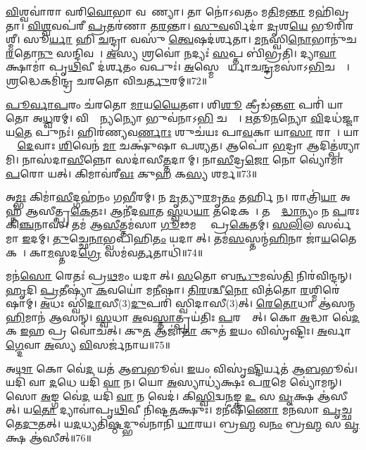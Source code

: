 \ul{𑌵𑌿}𑌶𑍍𑌵𑌵𑌾॑𑌰𑌾 𑌵𑌰𑌿\ul{𑌵𑍋}𑌭𑌾 𑌵𑌰𑍇᳚𑌣𑍍𑌯𑌾।
𑌤𑌾 𑌨𑍋॑𑌽𑌵𑌤𑌂 𑌮\ul{𑌤𑌿}𑌮\ul{𑌨𑍍𑌤𑌾} 𑌮𑌹𑌿॑𑌵𑍍𑌰𑌤𑌾।
\ul{𑌵𑌿}\ul{𑌶𑍍𑌵}𑌵𑌪॑𑌰𑍀 \ul{𑌪𑍍𑌰}𑌤𑌰॑𑌣𑌾 𑌤\ul{𑌰}𑌨𑍍𑌤𑌾।
\ul{𑌸𑍁}\ul{𑌵}𑌰𑍍𑌵𑌿𑌦𑌾॑ \ul{𑌦𑍃}𑌶\ul{𑌯𑍇} 𑌭𑍂𑌰𑌿॑𑌰𑌶𑍍𑌮𑍀।
𑌸𑍂\ul{𑌰𑍍𑌯𑌾} 𑌹𑌿 \ul{𑌚}𑌨𑍍𑌦𑍍𑌰𑌾 𑌵𑌸𑍁॑ \ul{𑌤𑍍𑌵𑍇}𑌷𑌦॑𑌰𑍍\mbox{}𑌶𑌤𑌾।
\ul{𑌮}\ul{𑌨}𑌸𑍍𑌵𑌿\ul{𑌨𑍋}𑌭𑌾𑌨𑍁॑𑌚\ul{𑌰}𑌤𑍋\ul{𑌨𑍁} 𑌸𑌨𑍍𑌦𑌿𑌵𑌮𑍍᳚।
\ul{𑌅}𑌸𑍍𑌯 𑌶𑍍𑌰𑌵𑍋॑ \ul{𑌨}𑌦𑍍𑌯𑌃॑ \ul{𑌸}𑌪𑍍𑌤 𑌬𑌿॑𑌭𑍍𑌰𑌤𑌿।
𑌦𑍍𑌯𑌾\ul{𑌵𑌾} 𑌕𑍍𑌷𑌾𑌮𑌾॑ 𑌪𑍃\ul{𑌥𑌿}𑌵𑍀 𑌦॑𑌰𑍍\mbox{}\ul{𑌶}𑌤𑌂 𑌵𑌪𑍁𑌃॑।
\ul{𑌅}𑌸𑍍𑌮𑍇 𑌸𑍂᳚𑌰𑍍𑌯𑌾𑌚\ul{𑌨𑍍𑌦𑍍𑌰}𑌮𑌸𑌾॑\-𑌽\ul{𑌭𑌿}𑌚𑌕𑍍𑌷𑍇᳚।
\ul{𑌶𑍍𑌰}𑌦𑍍𑌧𑍇𑌕𑌮𑌿॑𑌨𑍍𑌦𑍍𑌰 𑌚𑌰𑌤𑍋 𑌵𑌿𑌚\ul{𑌰𑍍𑌤𑍁}𑌰𑌮𑍍॥72॥

\ul{𑌪𑍂}\ul{𑌰𑍍𑌵𑌾}\ul{𑌪}𑌰𑌂 𑌚॑𑌰𑌤𑍋 \ul{𑌮𑌾}𑌯\ul{𑌯𑍈}𑌤𑍗।
𑌶𑌿\ul{𑌶𑍂} 𑌕𑍍𑌰𑍀𑌡॑\ul{𑌨𑍍𑌤𑍗} 𑌪𑌰𑌿॑ 𑌯𑌾𑌤𑍋 𑌅\ul{𑌧𑍍𑌵}𑌰𑌮𑍍।
𑌵𑌿𑌶𑍍𑌵𑌾᳚\ul{𑌨𑍍𑌯}𑌨𑍍𑌯𑍋 𑌭𑍁𑌵॑𑌨𑌾𑌽\ul{𑌭𑌿} 𑌚𑌷𑍍𑌟𑍇᳚।
\ul{𑌋}𑌤𑍂\ul{𑌨}𑌨𑍍𑌯𑍋 \ul{𑌵𑌿}𑌦𑌧॑𑌜𑍍𑌜𑌾𑌯\ul{𑌤𑍇} 𑌪𑍁𑌨𑌃॑।
𑌹𑌿𑌰॑𑌣𑍍𑌯𑌵\ul{𑌰𑍍𑌣𑌾𑌃} 𑌶𑍁𑌚॑𑌯𑌃 𑌪𑌾\ul{𑌵}𑌕𑌾 𑌯𑌾\ul{𑌸𑌾}\ul{} 𑌰𑌾𑌜𑌾᳚।
𑌯𑌾𑌸𑌾𑌂᳚ \ul{𑌦𑍇}𑌵𑌾𑌃 \ul{𑌶𑌿}𑌵𑍇𑌨॑ \ul{𑌮𑌾} 𑌚𑌕𑍍𑌷𑍁॑𑌷𑌾 𑌪𑌶𑍍𑌯𑌤।
𑌆𑌪𑍋॑ \ul{𑌭}𑌦𑍍𑌰𑌾 𑌆𑌦𑌿𑌤𑍍𑌪॑𑌶𑍍𑌯𑌾𑌮𑌿।
𑌨𑌾𑌸॑𑌦𑌾\ul{𑌸𑍀}𑌨𑍍𑌨𑍋 𑌸𑌦𑌾॑𑌸𑍀\ul{𑌤𑍍𑌤}𑌦𑌾𑌨𑍀᳚𑌮𑍍।
𑌨𑌾\ul{𑌸𑍀}𑌦𑍍𑌰\ul{𑌜𑍋} 𑌨𑍋 𑌵𑍍𑌯𑍋॑𑌮𑌾 \ul{𑌪}𑌰𑍋 𑌯𑌤𑍍।
𑌕𑌿𑌮𑌾𑌵॑𑌰𑍀\ul{𑌵𑌃} 𑌕𑍁\ul{𑌹} 𑌕\ul{𑌸𑍍𑌯} 𑌶𑌰𑍍𑌮\sn{}॥73॥

𑌅\ul{𑌮𑍍𑌭𑌃} 𑌕𑌿𑌮𑌾॑\ul{𑌸𑍀}𑌦𑍍𑌗𑌹॑𑌨𑌂 𑌗\ul{𑌭𑍀}𑌰𑌮𑍍।
𑌨 \ul{𑌮𑍃}𑌤𑍍𑌯𑍁\ul{𑌰}𑌮𑍃\ul{𑌤𑌂} 𑌤𑌰𑍍\mbox{}\ul{𑌹𑌿} 𑌨।
𑌰𑌾𑌤𑍍𑌰𑌿॑\ul{𑌯𑌾} 𑌅𑌹𑍍𑌨॑ 𑌆𑌸𑍀𑌤𑍍𑌪𑍍𑌰\ul{𑌕𑍇}𑌤𑌃।
𑌆𑌨𑍀॑𑌦\ul{𑌵𑌾}𑌤 \ul{𑌸𑍍𑌵}𑌧\ul{𑌯𑌾} 𑌤𑌦𑍇𑌕𑌮𑍍᳚।
𑌤𑌸𑍍𑌮𑌾᳚\ul{𑌦𑍍𑌧𑌾}𑌨𑍍𑌯𑌂 𑌨 \ul{𑌪}𑌰𑌃 𑌕𑌿\ul{𑌞𑍍𑌚}𑌨𑌾𑌸॑।
𑌤𑌮॑ 𑌆\ul{𑌸𑍀}𑌤𑍍𑌤𑌮॑𑌸𑌾 \ul{𑌗𑍂}𑌢𑌮𑌗𑍍𑌰𑍇᳚ 𑌪𑍍𑌰\ul{𑌕𑍇}𑌤𑌮𑍍।
\ul{𑌸}\ul{𑌲𑌿}𑌲 𑌸𑌰𑍍𑌵॑𑌮𑌾 \ul{𑌇}𑌦𑌮𑍍।
\ul{𑌤𑍁}𑌚𑍍𑌛𑍇\ul{𑌨𑌾}𑌭𑍍𑌵𑌪𑌿॑𑌹𑌿\ul{𑌤𑌂} 𑌯𑌦𑌾𑌸𑍀᳚𑌤𑍍।
𑌤𑌮॑\ul{𑌸}𑌸𑍍𑌤𑌨𑍍𑌮॑\ul{𑌹𑌿}𑌨𑌾 𑌜𑌾॑\ul{𑌯}𑌤𑍈𑌕𑌮𑍍᳚।
𑌕𑌾\ul{𑌮}𑌸𑍍𑌤𑌦\ul{𑌗𑍍𑌰𑍇} 𑌸𑌮॑𑌵\ul{𑌰𑍍𑌤}𑌤𑌾𑌧𑌿॑॥74॥

𑌮𑌨॑\ul{𑌸𑍋} 𑌰𑍇𑌤𑌃॑ 𑌪𑍍𑌰\ul{𑌥}𑌮𑌂 𑌯𑌦𑌾𑌸𑍀᳚𑌤𑍍।
\ul{𑌸}𑌤𑍋 𑌬\ul{𑌨𑍍𑌧𑍁}𑌮𑌸॑\ul{𑌤𑌿} 𑌨𑌿𑌰॑𑌵𑌿𑌨𑍍𑌦𑌨𑍍।
\ul{𑌹𑍃}𑌦𑌿 \ul{𑌪𑍍𑌰}𑌤𑍀𑌷𑍍𑌯𑌾॑ \ul{𑌕}𑌵𑌯𑍋॑ 𑌮\ul{𑌨𑍀}𑌷𑌾।
\ul{𑌤𑌿}\ul{𑌰}𑌶𑍍𑌚𑍀\ul{𑌨𑍋} 𑌵𑌿𑌤॑𑌤𑍋 \ul{𑌰}𑌶𑍍𑌮𑌿𑌰𑍇॑𑌷𑌾𑌮𑍍।
\ul{𑌅}𑌧𑌃 𑌸𑍍𑌵𑌿॑\ul{𑌦𑌾}𑌸𑍀(3)\ul{𑌦𑍁}𑌪𑌰𑌿॑ 𑌸𑍍𑌵𑌿𑌦𑌾𑌸𑍀(3)𑌤𑍍।
\ul{𑌰𑍇}\ul{𑌤𑍋}𑌧𑌾 𑌆॑𑌸𑌨𑍍𑌮\ul{𑌹𑌿}𑌮𑌾𑌨॑ 𑌆𑌸𑌨𑍍।
\ul{𑌸𑍍𑌵}𑌧𑌾 \ul{𑌅}𑌵\ul{𑌸𑍍𑌤𑌾}𑌤𑍍𑌪𑍍𑌰𑌯॑𑌤𑌿𑌃 \ul{𑌪}𑌰𑌸𑍍𑌤𑌾᳚𑌤𑍍।
𑌕𑍋 \ul{𑌅}𑌦𑍍𑌧𑌾 𑌵𑍇॑\ul{𑌦} 𑌕 \ul{𑌇}𑌹 𑌪𑍍𑌰 𑌵𑍋॑𑌚𑌤𑍍।
𑌕𑍁\ul{𑌤} 𑌆𑌜𑌾॑\ul{𑌤𑌾} 𑌕𑍁𑌤॑ \ul{𑌇}𑌯𑌂 𑌵𑌿𑌸𑍃॑𑌷𑍍𑌟𑌿𑌃।
\ul{𑌅}𑌰𑍍𑌵𑌾\ul{𑌗𑍍𑌦𑍇}𑌵𑌾 \ul{𑌅}𑌸𑍍𑌯 \ul{𑌵𑌿}𑌸𑌰𑍍𑌜॑𑌨𑌾𑌯॥75॥

𑌅\ul{𑌥𑌾} 𑌕𑍋 𑌵𑍇॑\ul{𑌦} 𑌯𑌤॑ 𑌆\ul{𑌬}𑌭𑍂𑌵॑।
\ul{𑌇}𑌯𑌂 𑌵𑌿𑌸𑍃॑\ul{𑌷𑍍𑌟𑌿}𑌰𑍍𑌯𑌤॑ 𑌆\ul{𑌬}𑌭𑍂𑌵॑।
𑌯𑌦𑌿॑ 𑌵𑌾 \ul{𑌦}𑌧𑍇 𑌯𑌦𑌿॑ \ul{𑌵𑌾} 𑌨।
𑌯𑍋 \ul{𑌅}𑌸𑍍𑌯𑌾𑌧𑍍𑌯॑𑌕𑍍𑌷𑌃 𑌪\ul{𑌰}𑌮𑍇 𑌵𑍍𑌯𑍋॑𑌮𑌨𑍍।
𑌸𑍋 \ul{𑌅}𑌙𑍍𑌗 𑌵𑍇॑\ul{𑌦} 𑌯𑌦𑌿॑ \ul{𑌵𑌾} 𑌨 𑌵𑍇𑌦॑।
𑌕𑌿\ul{𑌸𑍍𑌵𑌿}𑌦𑍍𑌵\ul{𑌨}𑌙𑍍𑌕 \ul{𑌉} 𑌸 \ul{𑌵𑍃}𑌕𑍍𑌷 𑌆॑𑌸𑍀𑌤𑍍।
𑌯\ul{𑌤𑍋} 𑌦𑍍𑌯𑌾𑌵𑌾॑𑌪𑍃\ul{𑌥𑌿}𑌵𑍀 𑌨𑌿॑𑌷𑍍𑌟\ul{𑌤}𑌕𑍍𑌷𑍁𑌃।
𑌮𑌨𑍀॑𑌷𑌿\ul{𑌣𑍋} 𑌮𑌨॑𑌸𑌾 \ul{𑌪𑍃}𑌚𑍍𑌛𑌤𑍇\ul{𑌦𑍁}𑌤𑌤𑍍।
𑌯\ul{𑌦}𑌧𑍍𑌯𑌤𑌿॑\ul{𑌷𑍍𑌠}𑌦𑍍𑌭𑍁𑌵॑𑌨𑌾𑌨𑌿 \ul{𑌧𑌾}𑌰𑌯\sn{}।
𑌬𑍍𑌰\ul{𑌹𑍍𑌮} 𑌵\ul{𑌨𑌂} 𑌬𑍍𑌰\ul{𑌹𑍍𑌮} 𑌸 \ul{𑌵𑍃}𑌕𑍍𑌷 𑌆॑𑌸𑍀𑌤𑍍॥76॥

